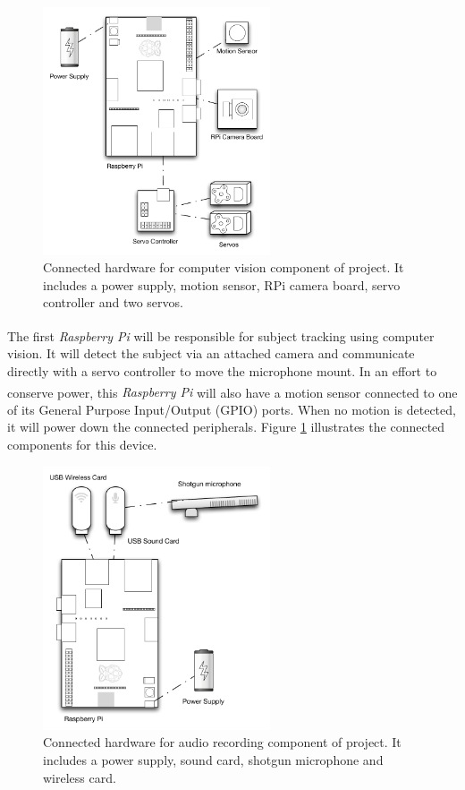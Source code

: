 \documentclass[11pt,a4paper,titlepage]{report}
\newcommand{\rpi}{\textit{Raspberry Pi\textsuperscript{\textregistered}}}
\begin{document}
\begin{figure}
\centering
\includegraphics[width=0.6\textwidth]{graphs/rpi_1.pdf}
\caption{Connected hardware for computer vision component of project. It includes a power supply, motion sensor, RPi camera board, servo controller and two servos.}
\label{fig:cvhardware}
\end{figure}


The first \rpi\xspace will be responsible for subject tracking using computer vision. It will detect the subject via an attached camera and communicate directly with a servo controller to move the microphone mount. In an effort to conserve power, this \rpi\xspace will also have a motion sensor connected to one of its General Purpose Input/Output (GPIO) ports. When no motion is detected, it will power down the connected peripherals. Figure \ref{fig:cvhardware} illustrates the connected components for this device.


\begin{figure}
\centering
\includegraphics[width=0.6\textwidth]{graphs/rpi_2.pdf}
\caption{Connected hardware for audio recording component of project. It includes a power supply, sound card, shotgun microphone and wireless card.}
\label{fig:audiohardware}
\end{figure}
\end{document}
